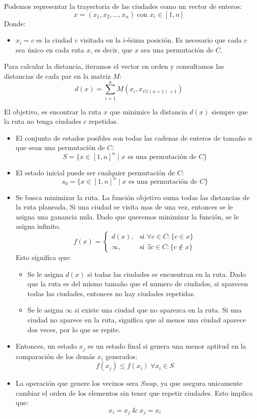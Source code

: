 \documentclass[12pt,twoside]{article}
\begin{document}
	Podemos representar la trayectoria de las ciudades como un vector de enteros:
	\[ x = (x_1, x_2, \dots, x_n) \; \text{con } x_i \in [1, n] \]
	Donde:
	\begin{itemize}
		\item $x_i = c$ es la ciudad $c$ visitada en la i-ésima posición. Es necesario que cada $c$ sea único en cada ruta $x$, es decir, que $x$ sea una permutación de $C$.
	\end{itemize}
	
	Para calcular la distancia, iteramos el vector en orden y consultamos las distancias de cada par en la matriz $M$: 
	\[ d(x) = \sum_{i = 1}^{n} M(x_i, x_{i \%(n+1)+ 1}) \]
	
	El objetivo, es encontrar la ruta $x$ que minimice la distancia $d(x)$ siempre que la ruta no tenga ciudades $c$ repetidas.
	
	\begin{itemize}
		\item El conjunto de estados posibles son todas las cadenas de enteros de tamaño $n$ que sean una permutación de $C$: \[ S = \{ x \in [1, n]^n \;|\; x \text{ es una permutación de } C \} \]
		
		\item El estado inicial puede ser cualquier permutación de $C$: 
		\[ s_0 = \{ x \in [1, n]^n \;|\; x \text{ es una permutación de } C \} \]
			
		\item Se busca minimizar la ruta. La función objetivo suma todas las distancias de la ruta planeada. Si una ciudad se visita mas de una vez, entonces se le asigna una ganancia nula. Dado que queremos minimizar la función, se le asigna infinito.
		\[
		f(x) =
		\begin{cases} 
			d(x), & \text{si } \forall c \in C \colon \{ c \in x \} \\ 
			\infty, & \text{si } \exists c \in C \colon \{c \notin x\}
		\end{cases}
		\]
		Esto significa que:
		\begin{itemize}
			\item Se le asigna $d(x)$ si todas las ciudades se encuentran en la ruta. Dado que la ruta es del mismo tamaño que el numero de ciudades, si aparecen todas las ciudades, entonces no hay ciudades repetidas.
			\item Se le asigna $\infty$ si existe una ciudad que no aparezca en la ruta. Si una ciudad no aparece en la ruta, significa que al menos una ciudad aparece dos veces, por lo que se repite.
		\end{itemize}
		
		\item Entonces, un estado $x_j$ es un estado final si genera una menor aptitud en la comparación de los demás $x_i$ generados: \[ f(x_j) \leq f(x_i) \; \forall x_i \in S \]
		
		\item La operación que genere los vecinos sera \textit{Swap}, ya que asegura unicamente cambiar el orden de los elementos sin tener que repetir ciudades. Esto implica que: \[ x_i = x_j \; \&  \; x_j = x_i \]
		
	\end{itemize}
	
\end{document}
